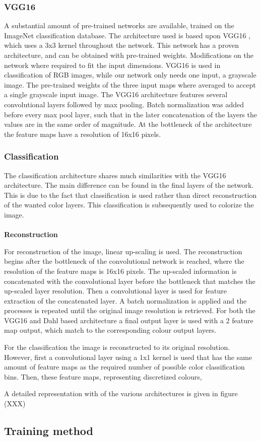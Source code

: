 
\subsubsection{VGG16}
A substantial amount of pre-trained networks are available, trained on the ImageNet classification database. The architecture used is based upon VGG16 \cite{Simonyan}, which uses a 3x3 kernel throughout the network. This network has a proven architecture, and can be obtained with pre-trained weights. Modifications on the network where required to fit the input dimensions. VGG16 is used in classification of RGB images, while our network only needs one input, a grayscale image. The pre-trained weights of the three input maps where averaged to accept a single grayscale input image. The VGG16 architecture features several convolutional layers followed by max pooling. Batch normalization was added before every max pool layer, such that in the later concatenation of the layers the values are in the same order of magnitude. At the bottleneck of the architecture the feature maps have a resolution of 16x16 pixels. 

\subsubsection{Classification}
The classification architecture shares much similarities with the VGG16 architecture. The main difference can be found in the final layers of the network. This is due to the fact that classification is used rather than direct reconstruction of the wanted color layers. This classification is subsequently used to colorize the image. \\
\\
\textbf{Reconstruction}

For reconstruction of the image, linear up-scaling is used. The reconstruction begins after the bottleneck of the convolutional network is reached, where the resolution of the feature maps is 16x16 pixels. The up-scaled information is concatenated with the convolutional layer before the bottleneck that matches the up-scaled layer resolution. Then a convolutional layer is used for feature extraction of the concatenated layer. A batch normalization is applied and the processes is repeated until the original image resolution is retrieved. For both the VGG16 and Dahl based architecture a final output layer is used with a 2 feature map output, which match to the corresponding colour output layers.

For the classification the image is reconstructed to its original resolution. However, first a convolutional layer using a 1x1 kernel is used that has the same amount of feature maps as the required number of possible color classification bins. Then, these feature maps, representing discretized colours, %

A detailed representation with of the various architectures is given in figure (XXX)



\subsection{Training method}
